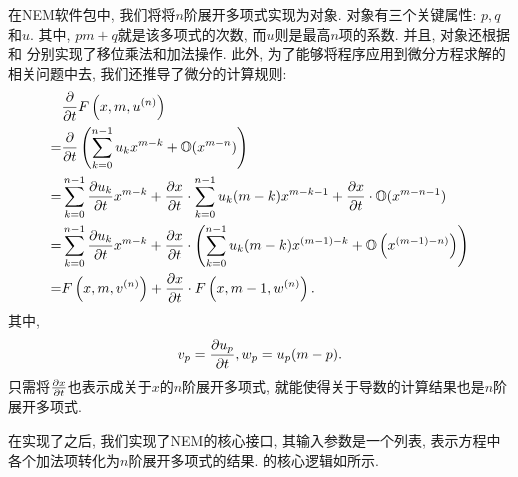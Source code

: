 在NEM软件包中, 我们将将$n$阶展开多项式实现为对象. 对象有三个关键属性: $p,q$和$u$. 其中, $pm+q$就是该多项式的次数, 而$u$则是最高$n$项的系数. 并且, 对象还根据\D {} 和  分别实现了移位\D 乘法和加法操作. 此外, 为了能够将程序应用到微分方程求解的相关问题中去, 我们还推导了微分的计算规则:
\begin{equation}
\begin{split}
& \frac{\partial}{\partial t}F\left(x,m,u^{(n)}\right)  \\
=& \frac{\partial}{\partial t}\left(\sum_{k=0}^{n-1}{u_k x^{m-k}}+\mathbb O(x^{m-n})\right) \\
=& \sum_{k=0}^{n-1}{\frac{\partial u_k}{\partial t}x^{m-k}}+\frac{\partial x}{\partial t}\cdot\sum_{k=0}^{n-1}{u_k (m-k) x^{m-k-1}}+\frac{\partial x}{\partial t}\cdot\mathbb O(x^{m-n-1}) \\
=& \sum_{k=0}^{n-1}{\frac{\partial u_k}{\partial t}x^{m-k}}+\frac{\partial x}{\partial t}\cdot\left(\sum_{k=0}^{n-1}{u_k (m-k) x^{(m-1)-k}}+\mathbb O\left(x^{(m-1)-n)}\right)\right) \\ 
=& F\left(x,m,v^{(n)}\right)+\frac{\partial x}{\partial t}\cdot F\left(x,m-1,w^{(n)}\right).
\end{split}\label{NEM-diff}
\end{equation}
其中, 
\begin{equation}
v_p=\frac{\partial u_p}{\partial t}, w_p=u_p(m-p).
\end{equation}
只需将$\frac{\partial x}{\partial t}$也表示成关于$x$的$n$阶展开多项式, 就能使得关于导数的计算结果也是$n$阶展开多项式. 

在实现了之后, 我们实现了NEM的核心接口, 其输入参数是一个列表, 表示方程中各个加法项转化为$n$阶展开多项式的结果. 的核心逻辑如所示. 

